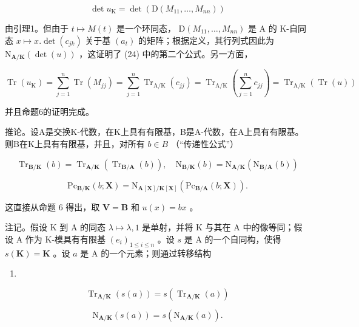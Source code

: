 \[
\det u _ {\mathrm{K}} = \det (\mathrm{D} (M _ {1 1}, \dots , M _ {n n}))
\]

由引理1。但由于 \(t \mapsto M(t)\) 是一个环同态， \(\mathrm{D}(M_{11},\ldots ,M_{nn})\) 是 A 的 K-自同态 \(x \mapsto x.\det (c_{jk})\) 关于基 \((a_t)\) 的矩阵；根据定义，其行列式因此为 \(\mathrm{N}_{\mathbf{A} / \mathbf{K}}(\det (u))\) ，这证明了 (24) 中的第二个公式。另一方面，

\[
\operatorname{Tr} \left(u _ {\mathrm{K}}\right) = \sum_ {j = 1} ^ {n} \operatorname{Tr} \left(M _ {j j}\right) = \sum_ {j = 1} ^ {n} \operatorname{Tr} _ {\mathrm{A} / \mathrm{K}} \left(c _ {j j}\right) = \operatorname{Tr} _ {\mathrm{A} / \mathrm{K}} \left(\sum_ {j = 1} ^ {n} c _ {j j}\right) = \operatorname{Tr} _ {\mathrm{A} / \mathrm{K}} (\operatorname{Tr} (u))
\]

并且命题6的证明完成。

推论。设A是交换K-代数，在K上具有有限基，B是A-代数，在A上具有有限基。则B在K上具有有限基，并且，对所有 \(b \in B\) （“传递性公式”）

\[
\operatorname{Tr} _ {\mathbf {B} / \mathbf {K}} (b) = \operatorname{Tr} _ {\mathbf {A} / \mathbf {K}} (\operatorname{Tr} _ {\mathbf {B} / \mathbf {A}} (b)), \quad \mathrm{N} _ {\mathbf {B} / \mathbf {K}} (b) = \mathrm{N} _ {\mathbf {A} / \mathbf {K}} (\mathrm{N} _ {\mathbf {B} / \mathbf {A}} (b))\tag{26}
\]

\[
\mathrm{Pc} _ {\mathbf {B} / \mathbf {K}} (b; \mathbf {X}) = \mathrm{N} _ {\mathbf {A} [ \mathbf {X} ] / \mathbf {K} [ \mathbf {X} ]} (\mathrm{Pc} _ {\mathbf {B} / \mathbf {A}} (b; \mathbf {X})).
\]

这直接从命题 6 得出，取 \(\mathbf{V} = \mathbf{B}\) 和 \(u(x) = bx\) 。

注记。假设 K 到 A 的同态 \(\lambda \mapsto \lambda, 1\) 是单射，并将 K 与其在 A 中的像等同；假设 A 作为 K-模具有有限基 \((e_i)_{1 \leqslant i \leqslant n}\) 。设 \(s\) 是 A 的一个自同构，使得 \(s(\mathbf{K}) = \mathbf{K}\) 。设 \(a\) 是 A 的一个元素；则通过转移结构

\begin{enumerate}
\def\labelenumi{(\arabic{enumi})}
\setcounter{enumi}{26}
\tightlist
\item
\end{enumerate}

\[
\operatorname{Tr} _ {\mathbf {A} / \mathbf {K}} (s (a)) = s (\operatorname{Tr} _ {\mathbf {A} / \mathbf {K}} (a))\tag{28}
\]

\[
\mathrm{N} _ {\mathbf {A} / \mathbf {K}} (s (a)) = s (\mathrm{N} _ {\mathbf {A} / \mathbf {K}} (a)).
\]


